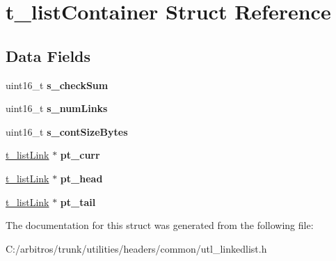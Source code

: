 \hypertarget{structt__list_container}{\section{t\-\_\-list\-Container Struct Reference}
\label{structt__list_container}
}
\subsection*{Data Fields}
\begin{DoxyCompactItemize}
\item 
\hypertarget{structt__list_container_ae35fb53f9e157f039ab75b17bf9ee9d5}{uint16\-\_\-t {\bfseries s\-\_\-check\-Sum}}\label{structt__list_container_ae35fb53f9e157f039ab75b17bf9ee9d5}

\item 
\hypertarget{structt__list_container_a985e3798e1a607173138847e90913d26}{uint16\-\_\-t {\bfseries s\-\_\-num\-Links}}\label{structt__list_container_a985e3798e1a607173138847e90913d26}

\item 
\hypertarget{structt__list_container_a4f3c2118acea71db33c395cab095a5a6}{uint16\-\_\-t {\bfseries s\-\_\-cont\-Size\-Bytes}}\label{structt__list_container_a4f3c2118acea71db33c395cab095a5a6}

\item 
\hypertarget{structt__list_container_a67fa6f908b35e42bf8c0228b2ca09930}{\hyperlink{structlist_link}{t\-\_\-list\-Link} $\ast$ {\bfseries pt\-\_\-curr}}\label{structt__list_container_a67fa6f908b35e42bf8c0228b2ca09930}

\item 
\hypertarget{structt__list_container_a752b039f96c82a26383b58bd2e27b20b}{\hyperlink{structlist_link}{t\-\_\-list\-Link} $\ast$ {\bfseries pt\-\_\-head}}\label{structt__list_container_a752b039f96c82a26383b58bd2e27b20b}

\item 
\hypertarget{structt__list_container_a109555d95754b4e1132d928c6fcf1626}{\hyperlink{structlist_link}{t\-\_\-list\-Link} $\ast$ {\bfseries pt\-\_\-tail}}\label{structt__list_container_a109555d95754b4e1132d928c6fcf1626}

\end{DoxyCompactItemize}


The documentation for this struct was generated from the following file\-:\begin{DoxyCompactItemize}
\item 
C\-:/arbitros/trunk/utilities/headers/common/utl\-\_\-linkedlist.\-h\end{DoxyCompactItemize}
